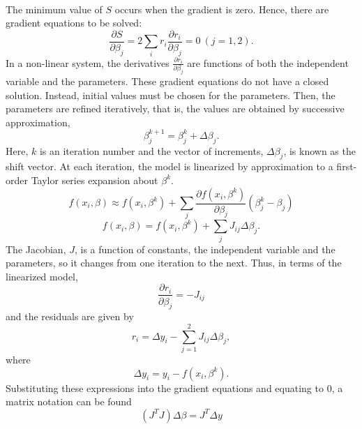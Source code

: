 \documentclass[a4paper,10pt]{report}
\begin{document}
\paragraph*{}
The minimum value of $S$ occurs when the gradient is zero. Hence, there are gradient equations to be solved:
\begin{equation}
    \frac{\partial S}{\partial \beta_j}=2\sum_i r_i\frac{\partial r_i}{\partial \beta_j}=0 \ (j=1,2).
\end{equation}
In a non-linear system, the derivatives $\frac{\partial r_i}{\partial \beta_j}$ are functions of both the independent
variable and the parameters. These gradient equations do not have a
closed solution. Instead, initial values must be chosen for the
parameters. Then, the parameters are refined iteratively, that is,
the values are obtained by successive approximation,
\begin{equation}
    \beta_j^{k+1}=\beta^k_j+\Delta \beta_j.
\end{equation}
Here, $k$ is an iteration number and the vector of increments, $\Delta \beta_j$, is known as the shift vector. At each iteration,
the model is linearized by approximation to a first-order Taylor series expansion about $\beta^k$.
\begin{equation}
    f(x_i,\beta)\approx f(x_i,\beta^k) +\sum_j \frac{\partial f(x_i, \beta^k)}{\partial \beta_j} \left(\beta^k_j -\beta_j \right)
\end{equation}
\begin{equation}
 f(x_i,\beta) =f(x_i, \beta^k)+\sum_j J_{ij} \Delta\beta_j.
\end{equation}
The Jacobian, $J$, is a function of constants, the independent
variable and the parameters, so it changes from one iteration to the
next. Thus, in terms of the linearized model,
\begin{equation}
\frac{\partial r_i}{\partial \beta_j}=-J_{ij}
\end{equation}
and the residuals are given by
\begin{equation}
    r_i=\Delta y_i- \sum_{j=1}^{2} J_{ij}\Delta\beta_j,
\end{equation}
where
\begin{equation}
 \Delta y_i=y_i- f(x_i, \beta^k).
\end{equation}
Substituting these expressions into the gradient equations and
equating to $0$, a matrix notation can be found
\begin{equation}
    \left(J^TJ\right)\Delta  \beta=J^T\Delta y
\end{equation}
\end{document}
